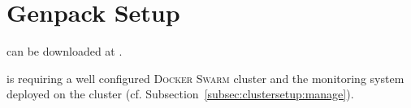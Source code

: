 
\section{Genpack Setup}
\label{sec:genpacksetup}

\GP{} can be downloaded at \genpackschedulerrepo{}.

\GP{} is requiring a well configured \textsc{Docker Swarm} cluster and the monitoring system deployed on the cluster (cf. Subsection~\ref{subsec:clustersetup:manage}).








